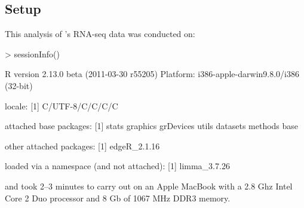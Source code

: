 \subsection{Setup}
This analysis of \citet{Li08}'s RNA-seq data was conducted on:
\begin{Schunk}
\begin{Sinput}
> sessionInfo()
\end{Sinput}
\begin{Soutput}
R version 2.13.0 beta (2011-03-30 r55205)
Platform: i386-apple-darwin9.8.0/i386 (32-bit)

locale:
[1] C/UTF-8/C/C/C/C

attached base packages:
[1] stats     graphics  grDevices utils     datasets  methods   base     

other attached packages:
[1] edgeR_2.1.16

loaded via a namespace (and not attached):
[1] limma_3.7.26
\end{Soutput}
\end{Schunk}
and took 2--3 minutes to carry out on an Apple MacBook with a 2.8 Ghz Intel Core 2 Duo processor and 8 Gb of 1067 MHz DDR3 memory.



